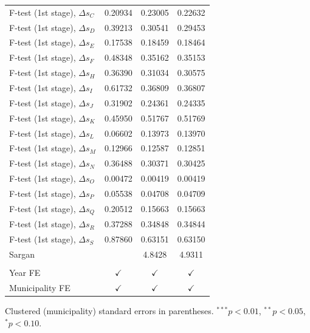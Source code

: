 \begin{tabular}{lccc}
   F-test (1st stage), $\Delta s_C$  & 0.20934       & 0.23005       & 0.22632\\  
   F-test (1st stage), $\Delta s_D$  & 0.39213       & 0.30541       & 0.29453\\  
   F-test (1st stage), $\Delta s_E$  & 0.17538       & 0.18459       & 0.18464\\  
   F-test (1st stage), $\Delta s_F$  & 0.48348       & 0.35162       & 0.35153\\  
   F-test (1st stage), $\Delta s_H$  & 0.36390       & 0.31034       & 0.30575\\  
   F-test (1st stage), $\Delta s_I$  & 0.61732       & 0.36809       & 0.36807\\  
   F-test (1st stage), $\Delta s_J$  & 0.31902       & 0.24361       & 0.24335\\  
   F-test (1st stage), $\Delta s_K$  & 0.45950       & 0.51767       & 0.51769\\  
   F-test (1st stage), $\Delta s_L$  & 0.06602       & 0.13973       & 0.13970\\  
   F-test (1st stage), $\Delta s_M$  & 0.12966       & 0.12587       & 0.12851\\  
   F-test (1st stage), $\Delta s_N$  & 0.36488       & 0.30371       & 0.30425\\  
   F-test (1st stage), $\Delta s_O$  & 0.00472       & 0.00419       & 0.00419\\  
   F-test (1st stage), $\Delta s_P$  & 0.05538       & 0.04708       & 0.04709\\  
   F-test (1st stage), $\Delta s_Q$  & 0.20512       & 0.15663       & 0.15663\\  
   F-test (1st stage), $\Delta s_R$  & 0.37288       & 0.34848       & 0.34844\\  
   F-test (1st stage), $\Delta s_S$  & 0.87860       & 0.63151       & 0.63150\\  
   Sargan                            &               & 4.8428        & 4.9311\\  
    \\
   Year FE                           & $\checkmark$  & $\checkmark$  & $\checkmark$\\   
   Municipality FE                   & $\checkmark$  & $\checkmark$  & $\checkmark$\\   
   \bottomrule
\end{tabular}
 
\par \raggedright 
Clustered (municipality) standard errors in parentheses. $^{***}p<0.01$, $^{**}p<0.05$, $^{*}p<0.10$.
\par\endgroup
